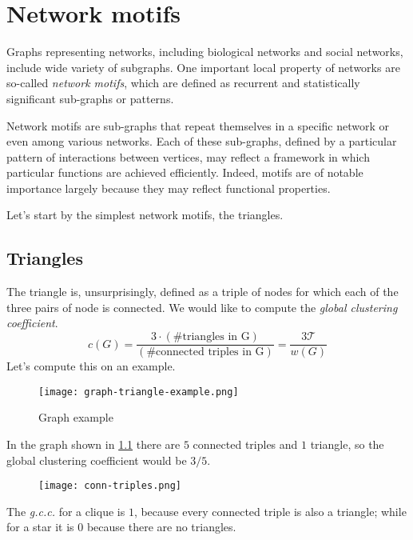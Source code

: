 \chapter{Network motifs}\label{sec:motifs}

Graphs representing networks, including biological networks and social networks, include wide variety of subgraphs. One important local property of networks are so-called \emph{network motifs}, which are defined as recurrent and statistically significant sub-graphs or patterns.

Network motifs are sub-graphs that repeat themselves in a specific network or even among various networks. Each of these sub-graphs, defined by a particular pattern of interactions between vertices, may reflect a framework in which particular functions are achieved efficiently. Indeed, motifs are of notable importance largely because they may reflect functional properties.

Let's start by the simplest network motifs, the triangles.

\section{Triangles}
The triangle is, unsurprisingly, defined as a triple of nodes for which each of the three pairs of node is connected. 
We would like to compute the \emph{global clustering coefficient}.
\[
	c(G) = \frac{3 \cdot \left(\text{\# triangles in G}\right)}{\left(\text{\# connected triples in G}\right)} = \frac{3 \mathcal{T}}{w(G)}
\]
%
Let's compute this on an example.
%
\begin{figure}[h!]
	\centering
	\texttt{[image: graph-triangle-example.png]}
	\caption{Graph example}\label{fig:graph-example-triangles}
\end{figure}

In the graph shown in \cref{fig:graph-example-triangles} there are $5$ connected triples and $1$ triangle, so the global clustering coefficient would be $3/5$.
%
\begin{figure}[h!]
	\centering
	\texttt{[image: conn-triples.png]}
\end{figure}

The \emph{g.c.c.} for a clique is $1$, because every connected triple is also a triangle; while for a star it is $0$ because there are no triangles.

